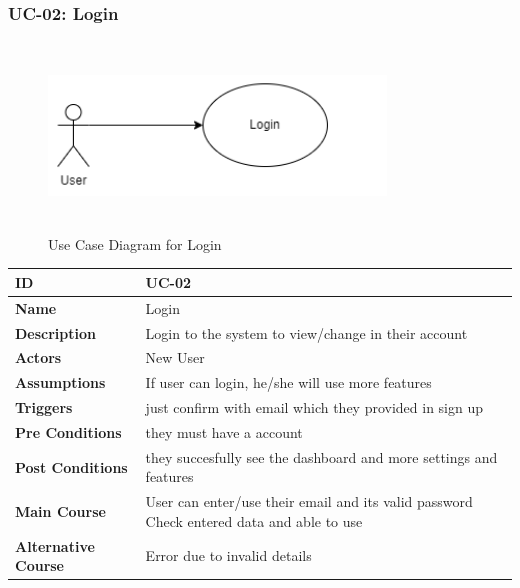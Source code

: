     \subsubsection{UC-02: Login}
    \begin{figure}[H]
        \includegraphics[height=5cm, width=0.8\textwidth]{./diagrams/Use Case/u2.png}
        \centering 
        \caption{Use Case Diagram for Login}
        \label{Usecase1}
        \end{figure}
        
    
    \begin{center}
        \begin{tabularx}{\textwidth}{|l|X|}
            \hline
            \textbf{ID} & UC-02 \\
            \hline
            \textbf{Name} & Login \\
            \hline
            \textbf{Description} & Login to the system to view/change in their account \\
            \hline
            \textbf{Actors} & New User \\
            \hline
            \textbf{Assumptions} & If user can login, he/she will use more features \\
            \hline
            \textbf{Triggers} & just confirm with email which they provided in sign up \\
            \hline
            \textbf{Pre Conditions} & they must have a account \\
            \hline
            \textbf{Post Conditions} & they succesfully see the dashboard and more settings and features \\
            \hline
            \textbf{Main Course} & User can enter/use their email and its valid password Check entered data and able to use \\
            \hline
            \textbf{Alternative Course} & Error due to invalid details \\
            \hline
            
        \end{tabularx}
    \end{center}
    \newpage
    


